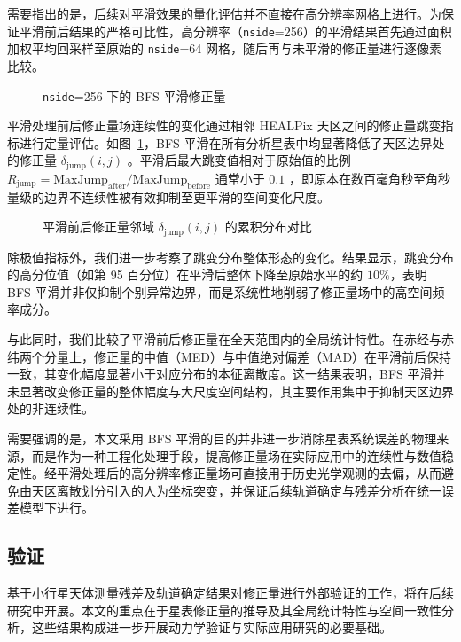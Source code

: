 \documentclass{aastex701}
\begin{document}
需要指出的是，后续对平滑效果的量化评估并不直接在高分辨率网格上进行。为保证平滑前后结果的严格可比性，高分辨率（\texttt{nside}=256）的平滑结果首先通过面积加权平均回采样至原始的 \texttt{nside}=64 网格，随后再与未平滑的修正量进行逐像素比较。
\begin{figure}[ht!]
\caption{\texttt{nside}=256 下的 BFS 平滑修正量}
\label{fig:bias_smooth}
\end{figure}
平滑处理前后修正量场连续性的变化通过相邻 HEALPix 天区之间的修正量跳变指标进行定量评估。如图~\ref{fig:bias_smooth}，BFS 平滑在所有分析星表中均显著降低了天区边界处的修正量 $\delta_{\text{jump}} (i, j)$ 。平滑后最大跳变值相对于原始值的比例 $R_{\mathrm{jump}}=\mathrm{MaxJump}_{\mathrm{after}}/\mathrm{MaxJump}_{\mathrm{before}}$ 通常小于 $0.1$ ，即原本在数百毫角秒至角秒量级的边界不连续性被有效抑制至更平滑的空间变化尺度。
\begin{figure}[ht!]
\caption{平滑前后修正量邻域 $\delta_{\text{jump}} (i, j)$ 的累积分布对比}
\label{fig:bias_jump}
\end{figure}
除极值指标外，我们进一步考察了跳变分布整体形态的变化。结果显示，跳变分布的高分位值（如第 95 百分位）在平滑后整体下降至原始水平的约 $10\%$，表明 BFS 平滑并非仅抑制个别异常边界，而是系统性地削弱了修正量场中的高空间频率成分。


与此同时，我们比较了平滑前后修正量在全天范围内的全局统计特性。在赤经与赤纬两个分量上，修正量的中值（MED）与中值绝对偏差（MAD）在平滑前后保持一致，其变化幅度显著小于对应分布的本征离散度。这一结果表明，BFS 平滑并未显著改变修正量的整体幅度与大尺度空间结构，其主要作用集中于抑制天区边界处的非连续性。

需要强调的是，本文采用 BFS 平滑的目的并非进一步消除星表系统误差的物理来源，而是作为一种工程化处理手段，提高修正量场在实际应用中的连续性与数值稳定性。经平滑处理后的高分辨率修正量场可直接用于历史光学观测的去偏，从而避免由天区离散划分引入的人为坐标突变，并保证后续轨道确定与残差分析在统一误差模型下进行。

\subsection{验证} \label{subsec:validation}

基于小行星天体测量残差及轨道确定结果对修正量进行外部验证的工作，将在后续研究中开展。本文的重点在于星表修正量的推导及其全局统计特性与空间一致性分析，这些结果构成进一步开展动力学验证与实际应用研究的必要基础。
\end{document}
